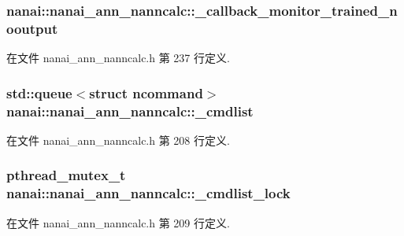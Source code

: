 \subsubsection[{\+\_\+callback\+\_\+monitor\+\_\+trained\+\_\+nooutput}]{ nanai\+::nanai\+\_\+ann\+\_\+nanncalc\+::\+\_\+callback\+\_\+monitor\+\_\+trained\+\_\+nooutput\hspace{0.3cm}{\ttfamily [protected]}}\label{classnanai_1_1nanai__ann__nanncalc_a0395dff2948785f646f22be1df04bad1}


在文件 nanai\+\_\+ann\+\_\+nanncalc.\+h 第 237 行定义.

\hypertarget{classnanai_1_1nanai__ann__nanncalc_a9af0b8bc21e0d398f3f9489acf1dfab7}{}
\subsubsection[{\+\_\+cmdlist}]{\setlength{\rightskip}{0pt plus 5cm}std\+::queue$<$struct {\bf ncommand}$>$ nanai\+::nanai\+\_\+ann\+\_\+nanncalc\+::\+\_\+cmdlist\hspace{0.3cm}{\ttfamily [protected]}}\label{classnanai_1_1nanai__ann__nanncalc_a9af0b8bc21e0d398f3f9489acf1dfab7}


在文件 nanai\+\_\+ann\+\_\+nanncalc.\+h 第 208 行定义.

\hypertarget{classnanai_1_1nanai__ann__nanncalc_a92213def4dd3f7f0693159a79446ea09}{}
\subsubsection[{\+\_\+cmdlist\+\_\+lock}]{\setlength{\rightskip}{0pt plus 5cm}pthread\+\_\+mutex\+\_\+t nanai\+::nanai\+\_\+ann\+\_\+nanncalc\+::\+\_\+cmdlist\+\_\+lock\hspace{0.3cm}{\ttfamily [protected]}}\label{classnanai_1_1nanai__ann__nanncalc_a92213def4dd3f7f0693159a79446ea09}


在文件 nanai\+\_\+ann\+\_\+nanncalc.\+h 第 209 行定义.


